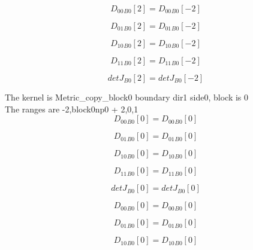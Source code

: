 \documentclass{article}
\begin{document}
\begin{dmath}{D_{00}{_{B0}}}[{2}] = {D_{00}{_{B0}}}[{-2}]\end{dmath}

\begin{dmath}{D_{01}{_{B0}}}[{2}] = {D_{01}{_{B0}}}[{-2}]\end{dmath}

\begin{dmath}{D_{10}{_{B0}}}[{2}] = {D_{10}{_{B0}}}[{-2}]\end{dmath}

\begin{dmath}{D_{11}{_{B0}}}[{2}] = {D_{11}{_{B0}}}[{-2}]\end{dmath}

\begin{dmath}{detJ{_{B0}}}[{2}] = {detJ{_{B0}}}[{-2}]\end{dmath}

\noindent The kernel is Metric_copy_block0 boundary dir1 side0, block is 0\\\noindent The ranges are -2,block0np0 + 2,0,1\\\begin{dmath}{D_{00}{_{B0}}}[{0}] = {D_{00}{_{B0}}}[{0}]\end{dmath}

\begin{dmath}{D_{01}{_{B0}}}[{0}] = {D_{01}{_{B0}}}[{0}]\end{dmath}

\begin{dmath}{D_{10}{_{B0}}}[{0}] = {D_{10}{_{B0}}}[{0}]\end{dmath}

\begin{dmath}{D_{11}{_{B0}}}[{0}] = {D_{11}{_{B0}}}[{0}]\end{dmath}

\begin{dmath}{detJ{_{B0}}}[{0}] = {detJ{_{B0}}}[{0}]\end{dmath}

\begin{dmath}{D_{00}{_{B0}}}[{0}] = {D_{00}{_{B0}}}[{0}]\end{dmath}

\begin{dmath}{D_{01}{_{B0}}}[{0}] = {D_{01}{_{B0}}}[{0}]\end{dmath}

\begin{dmath}{D_{10}{_{B0}}}[{0}] = {D_{10}{_{B0}}}[{0}]\end{dmath}
\end{document}
